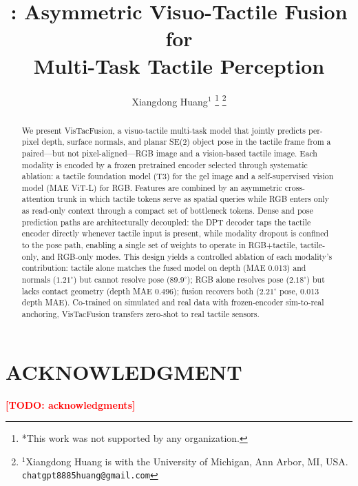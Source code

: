 \documentclass[letterpaper, 10pt, conference]{ieeeconf}
\title{\LARGE \bf
\method{}: Asymmetric Visuo-Tactile Fusion for\\
Multi-Task Tactile Perception
}
\author{Xiangdong Huang$^{1}$%
\thanks{*This work was not supported by any organization.}%
\thanks{$^{1}$Xiangdong Huang is with the University of Michigan,
        Ann Arbor, MI, USA.
        {\tt\small chatgpt8885huang@gmail.com}}%
}
\newcommand{\method}{VisTacFusion}
\newcommand{\todo}[1]{\textbf{\textcolor{red}{[TODO: #1]}}}
\begin{document}
\maketitle
\thispagestyle{empty}
\pagestyle{empty}

\begin{abstract}
We present \method{}, a visuo-tactile multi-task model that jointly predicts
per-pixel depth, surface normals, and planar SE(2) object pose in the tactile
frame from a paired---but not pixel-aligned---RGB image and a vision-based
tactile image. Each modality is encoded by a frozen pretrained
encoder selected through systematic ablation: a tactile foundation model (T3)
for the gel image and a self-supervised vision model (MAE ViT-L) for RGB.
Features are combined by an asymmetric cross-attention trunk in which tactile
tokens serve as spatial queries while RGB enters only as read-only context
through a compact set of bottleneck tokens. Dense and pose prediction paths
are architecturally decoupled: the DPT decoder taps the tactile encoder
directly whenever tactile input is present, while modality dropout is
confined to the pose path, enabling a single set of weights to operate in
RGB+tactile, tactile-only, and RGB-only modes. This design yields a
controlled ablation of each modality's contribution: tactile alone matches
the fused model on depth (MAE 0.013) and normals ($1.21^{\circ}$) but
cannot resolve pose ($89.9^{\circ}$); RGB alone resolves pose
($2.18^{\circ}$) but lacks contact geometry (depth MAE 0.496); fusion
recovers both ($2.21^{\circ}$ pose, 0.013 depth MAE). Co-trained on
simulated and real data with frozen-encoder sim-to-real anchoring,
\method{} transfers zero-shot to real tactile sensors.
\end{abstract}









\section*{ACKNOWLEDGMENT}
\todo{acknowledgments}




\end{document}
